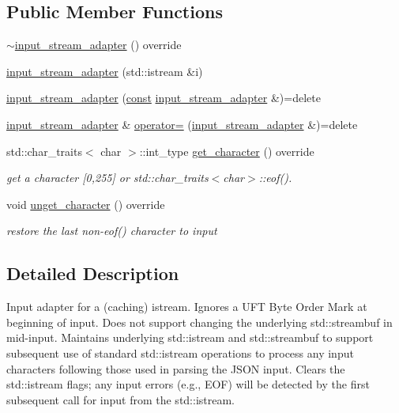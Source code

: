 \subsection*{Public Member Functions}
\begin{DoxyCompactItemize}
\item 
\hyperlink{classnlohmann_1_1detail_1_1input__stream__adapter_a2d71eb469267abd864f765481d1e823f}{$\sim$input\+\_\+stream\+\_\+adapter} () override
\item 
\hyperlink{classnlohmann_1_1detail_1_1input__stream__adapter_af487152e4606d013eb4ec6a90eaf82ea}{input\+\_\+stream\+\_\+adapter} (std\+::istream \&i)
\item 
\hyperlink{classnlohmann_1_1detail_1_1input__stream__adapter_a5190fe4d0c5ff2e3b348b28ee3bb2218}{input\+\_\+stream\+\_\+adapter} (\hyperlink{functions__c_8js_afacfd9c985d225bb07483b887a801b6f}{const} \hyperlink{classnlohmann_1_1detail_1_1input__stream__adapter}{input\+\_\+stream\+\_\+adapter} \&)=delete
\item 
\hyperlink{classnlohmann_1_1detail_1_1input__stream__adapter}{input\+\_\+stream\+\_\+adapter} \& \hyperlink{classnlohmann_1_1detail_1_1input__stream__adapter_aeac5048221929b8f7558d1698dd0fb3a}{operator=} (\hyperlink{classnlohmann_1_1detail_1_1input__stream__adapter}{input\+\_\+stream\+\_\+adapter} \&)=delete
\item 
std\+::char\+\_\+traits$<$ char $>$\+::int\+\_\+type \hyperlink{classnlohmann_1_1detail_1_1input__stream__adapter_ae0760af923583de6354725e901d1869d}{get\+\_\+character} () override
\begin{DoxyCompactList}\small\item\em get a character \mbox{[}0,255\mbox{]} or std\+::char\+\_\+traits$<$char$>$\+::eof(). \end{DoxyCompactList}\item 
void \hyperlink{classnlohmann_1_1detail_1_1input__stream__adapter_ab6a65d3816ce4027ef4d2013a13ee697}{unget\+\_\+character} () override
\begin{DoxyCompactList}\small\item\em restore the last non-\/eof() character to input \end{DoxyCompactList}\end{DoxyCompactItemize}


\subsection{Detailed Description}
Input adapter for a (caching) istream. Ignores a U\+FT Byte Order Mark at beginning of input. Does not support changing the underlying std\+::streambuf in mid-\/input. Maintains underlying std\+::istream and std\+::streambuf to support subsequent use of standard std\+::istream operations to process any input characters following those used in parsing the J\+S\+ON input. Clears the std\+::istream flags; any input errors (e.\+g., E\+OF) will be detected by the first subsequent call for input from the std\+::istream. 

